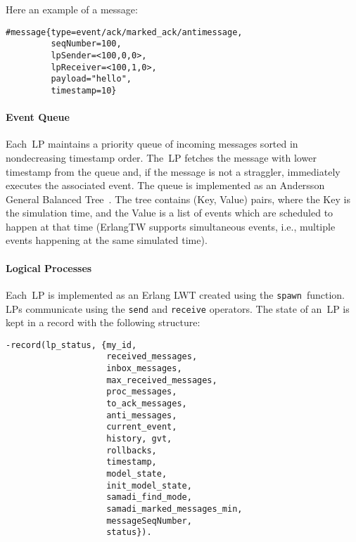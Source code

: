 \documentclass{sigplanconf}
\begin{document}
Here an example of a message:

\begin{verbatim}
#message{type=event/ack/marked_ack/antimessage, 
         seqNumber=100, 
         lpSender=<100,0,0>,
         lpReceiver=<100,1,0>, 
         payload="hello", 
         timestamp=10}
\end{verbatim}

\paragraph*{Event Queue}
Each~\ac{LP} maintains a priority queue of incoming messages sorted in
nondecreasing timestamp order. The~\ac{LP} fetches the message with
lower timestamp from the queue and, if the message is not a straggler,
immediately executes the associated event. The queue is implemented as
an Andersson General Balanced Tree~\cite{And99}. The tree contains
(Key, Value) pairs, where the Key is the simulation time, and the
Value is a list of events which are scheduled to happen at that time
(ErlangTW supports simultaneous events, i.e., multiple events
happening at the same simulated time).

\paragraph*{Logical Processes}
Each~\ac{LP} is implemented as an Erlang LWT created using the
\verb+spawn+\ function. \acp{LP} communicate using the \verb+send+ and
\verb+receive+ operators. The state of an~\ac{LP} is kept in a record
with the following structure:

\begin{verbatim}
-record(lp_status, {my_id, 
                    received_messages, 
                    inbox_messages, 
                    max_received_messages,
                    proc_messages,  
                    to_ack_messages, 
                    anti_messages, 
                    current_event,
                    history, gvt, 
                    rollbacks, 
                    timestamp,
                    model_state, 
                    init_model_state,
                    samadi_find_mode, 
                    samadi_marked_messages_min, 
                    messageSeqNumber, 
                    status}).
\end{verbatim}
\end{document}
